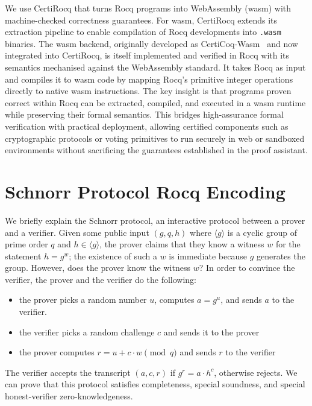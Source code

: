 \documentclass[sigconf, anonymous]{acmart}
\begin{document}
We use CertiRocq \cite{anand2017certicoq} that turns Rocq programs into WebAssembly (wasm) with machine-checked correctness guarantees. For wasm, CertiRocq extends its extraction pipeline to enable compilation of Rocq developments into \texttt{.wasm} binaries. The wasm backend, originally developed as CertiCoq-Wasm~\cite{meier2025certicoq} and now integrated into CertiRocq, is itself implemented and verified in Rocq with its semantics mechanised against the WebAssembly standard. It takes Rocq as input and compiles it to wasm code by mapping Rocq's primitive integer operations directly to native wasm instructions. The key insight is that programs proven correct within Rocq can be extracted, compiled, and executed in a wasm runtime while preserving their formal semantics. This bridges high-assurance formal verification with practical deployment, allowing certified components such as cryptographic protocols or voting primitives to run securely in web or sandboxed environments without sacrificing the guarantees established in the proof assistant. 




\section{Schnorr Protocol Rocq Encoding}\label{schn_proof}
  We briefly explain the Schnorr protocol, an interactive protocol 
  between a prover and a verifier. 
  Given some public input $(g, q, h)$ where $\langle g\rangle$
  is a cyclic group of prime order $q$ and $h\in\langle g\rangle$,
  the prover claims that they know a
  witness $w$ for the statement $h = g^w$; the existence of such
  a $w$ is immediate because $g$ generates the group. However,
  does the prover know the witness $w$? In order to convince the
  verifier, the prover and the verifier do the following:
  \begin{itemize}
    \item the prover picks a random number $u$, computes $a = g^u$,
    and sends $a$ to the verifier.
    \item the verifier picks a random challenge $c$ and sends it to
    the prover
    \item the prover computes $r = u + c \cdot w \pmod q$ and sends $r$ to the
    verifier
  \end{itemize}

The verifier accepts the transcript $(a, c, r)$ if $g^r = a \cdot h^c$, otherwise rejects. We can prove that 
this protocol satisfies completeness, special soundness, and special honest-verifier 
zero-knowledgeness. 
\end{document}
